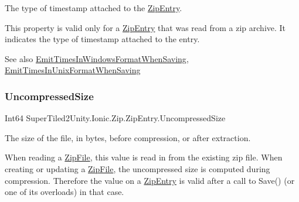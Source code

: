 The type of timestamp attached to the \mbox{\hyperlink{class_super_tiled2_unity_1_1_ionic_1_1_zip_1_1_zip_entry}{Zip\+Entry}}. 

This property is valid only for a \mbox{\hyperlink{class_super_tiled2_unity_1_1_ionic_1_1_zip_1_1_zip_entry}{Zip\+Entry}} that was read from a zip archive. It indicates the type of timestamp attached to the entry. 

\begin{DoxySeeAlso}{See also}
\mbox{\hyperlink{class_super_tiled2_unity_1_1_ionic_1_1_zip_1_1_zip_entry_affabc22ba72be27e9134676becddcec7}{Emit\+Times\+In\+Windows\+Format\+When\+Saving}}, \mbox{\hyperlink{class_super_tiled2_unity_1_1_ionic_1_1_zip_1_1_zip_entry_afd50bda347e67681780f32ebdba43f58}{Emit\+Times\+In\+Unix\+Format\+When\+Saving}}


\end{DoxySeeAlso}
\mbox{\label{class_super_tiled2_unity_1_1_ionic_1_1_zip_1_1_zip_entry_ad41c71d426caa6377c1af3682bd2055c}} 
\subsubsection{\texorpdfstring{Uncompressed\+Size}{UncompressedSize}}
{\footnotesize\ttfamily Int64 Super\+Tiled2\+Unity.\+Ionic.\+Zip.\+Zip\+Entry.\+Uncompressed\+Size\hspace{0.3cm}{\ttfamily [get]}}



The size of the file, in bytes, before compression, or after extraction. 

When reading a {\ttfamily \mbox{\hyperlink{class_super_tiled2_unity_1_1_ionic_1_1_zip_1_1_zip_file}{Zip\+File}}}, this value is read in from the existing zip file. When creating or updating a {\ttfamily \mbox{\hyperlink{class_super_tiled2_unity_1_1_ionic_1_1_zip_1_1_zip_file}{Zip\+File}}}, the uncompressed size is computed during compression. Therefore the value on a {\ttfamily \mbox{\hyperlink{class_super_tiled2_unity_1_1_ionic_1_1_zip_1_1_zip_entry}{Zip\+Entry}}} is valid after a call to {\ttfamily Save()} (or one of its overloads) in that case. 

